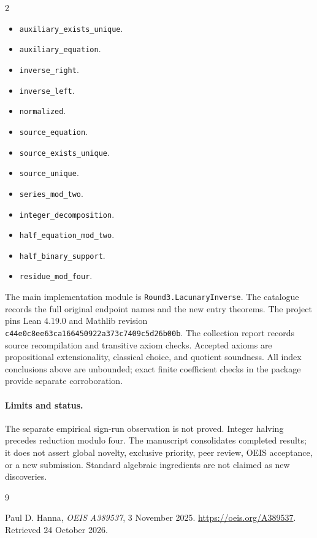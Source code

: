 \documentclass[11pt,a4paper]{article}
\theoremstyle{remark}
\begin{document}
\begin{multicols}{2}\raggedright\begin{itemize}\setlength{\itemsep}{2pt}\setlength{\parsep}{0pt}
\item \nolinkurl{auxiliary_exists_unique}.
\item \nolinkurl{auxiliary_equation}.
\item \nolinkurl{inverse_right}.
\item \nolinkurl{inverse_left}.
\item \nolinkurl{normalized}.
\item \nolinkurl{source_equation}.
\item \nolinkurl{source_exists_unique}.
\item \nolinkurl{source_unique}.
\item \nolinkurl{series_mod_two}.
\item \nolinkurl{integer_decomposition}.
\item \nolinkurl{half_equation_mod_two}.
\item \nolinkurl{half_binary_support}.
\item \nolinkurl{residue_mod_four}.
\end{itemize}\end{multicols}

The main implementation module is \nolinkurl{Round3.LacunaryInverse}.
The catalogue records the full original endpoint names and the new entry
theorems. The project pins Lean 4.19.0 and Mathlib revision
\nolinkurl{c44e0c8ee63ca166450922a373c7409c5d26b00b}. The collection
report records source recompilation and transitive axiom checks. Accepted
axioms are propositional extensionality, classical choice, and quotient
soundness. All index conclusions above are unbounded; exact finite
coefficient checks in the package provide separate corroboration.

\paragraph{Limits and status.}
The separate empirical sign-run observation is not proved. Integer halving precedes reduction modulo four.
The manuscript consolidates completed results; it does not assert global
novelty, exclusive priority, peer review, OEIS acceptance, or a new submission.
Standard algebraic ingredients are not claimed as new discoveries.

\begin{thebibliography}{9}
\raggedright
{}
Paul D. Hanna, \emph{OEIS A389537}, 3 November 2025.
\url{https://oeis.org/A389537}. Retrieved 24 October 2026.
\end{thebibliography}
\end{document}
